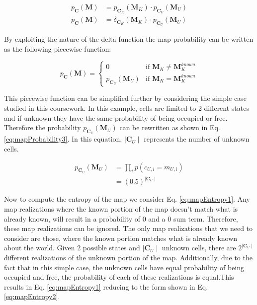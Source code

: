 \documentclass[a4paper,12pt]{article}
\begin{document}
			\begin{equation}
				\begin{split}
					p_\textbf{C}(\textbf{M}) &= p_{\textbf{C}_K}(\textbf{M}_K) \cdot p_{\textbf{C}_U}(\textbf{M}_U) \\
					p_\textbf{C}(\textbf{M}) &= \delta_{\textbf{C}_K}(\textbf{M}_K) \cdot p_{\textbf{C}_U}(\textbf{M}_U) 
				\end{split}
				\label{eq:mapProbability2}
			\end{equation}

			By exploiting the nature of the delta function the map probability can be written as the following piecewise function:

			\[
				p_\textbf{C}(\textbf{M}) =
				\begin{cases}
					0 										& \text{if $\textbf{M}_K \neq \textbf{M}_K^{known}$} \\
					p_{\textbf{C}_U}(\textbf{M}_U) 			& \text{if $\textbf{M}_K = \textbf{M}_K^{known}$} 
				\end{cases}
			\]
			
			This piecewise function can be simplified further by considering the simple case studied in this coursework. In this example, cells are limited to 2 different states and if unknown they have the same probability of being occupied or free. Therefore the probability $p_{\textbf{C}_U}(\textbf{M}_U)$ can be rewritten as shown in Eq. \ref{eq:mapProbability3}. In this equation, $\mid \textbf{C}_U \mid$ represents the number of unknown cells. 

			\begin{equation}
				\begin{split}
					p_{\textbf{C}_U}(\textbf{M}_U) &= \prod_{i} p(c_{U,i} = m_{U,i}) \\
					&= \left(0.5\right)^{\mid \textbf{C}_U \mid}
				\end{split}
				\label{eq:mapProbability3}
			\end{equation}

			Now to compute the entropy of the map we consider Eq. \ref{eq:mapEntropy1}. Any map realizations where the known portion of the map doesn't match what is already known, will result in a probability of 0 and a 0 sum term. Therefore, these map realizations can be ignored. The only map realizations that we need to consider are those, where the known portion matches what is already known about the world. Given 2 possible states and $\mid \textbf{C}_U \mid$ unknown cells, there are $2^{\mid \textbf{C}_U \mid}$ different realizations of the unknown portion of the map. Additionally, due to the fact that in this simple case, the unknown cells have equal probability of being occupied and free, the probability of each of these realizations is equal.This results in Eq. \ref{eq:mapEntropy1} reducing to the form shown in Eq. \ref{eq:mapEntropy2}.
\end{document}
